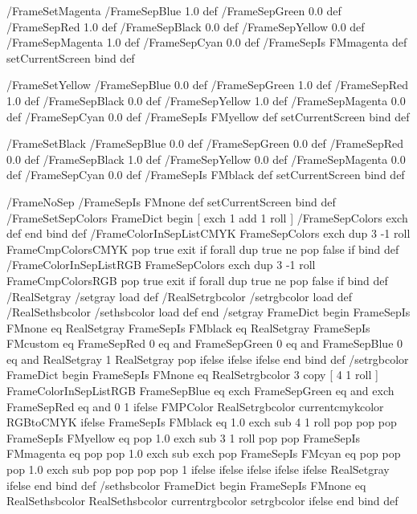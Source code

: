 /FrameSetMagenta {
	/FrameSepBlue 1.0 def
	/FrameSepGreen 0.0 def
	/FrameSepRed 1.0 def
	/FrameSepBlack 0.0 def
	/FrameSepYellow 0.0 def
	/FrameSepMagenta 1.0 def
	/FrameSepCyan 0.0 def
	/FrameSepIs FMmagenta def
	setCurrentScreen
} bind def
 
/FrameSetYellow {
	/FrameSepBlue 0.0 def
	/FrameSepGreen 1.0 def
	/FrameSepRed 1.0 def
	/FrameSepBlack 0.0 def
	/FrameSepYellow 1.0 def
	/FrameSepMagenta 0.0 def
	/FrameSepCyan 0.0 def
	/FrameSepIs FMyellow def
	setCurrentScreen
} bind def
 
/FrameSetBlack {
	/FrameSepBlue 0.0 def
	/FrameSepGreen 0.0 def
	/FrameSepRed 0.0 def
	/FrameSepBlack 1.0 def
	/FrameSepYellow 0.0 def
	/FrameSepMagenta 0.0 def
	/FrameSepCyan 0.0 def
	/FrameSepIs FMblack def
	setCurrentScreen
} bind def
 
/FrameNoSep { 
	/FrameSepIs FMnone def
	setCurrentScreen
} bind def
/FrameSetSepColors { 
	FrameDict begin
	[ exch 1 add 1 roll ]
	/FrameSepColors  
	exch def end
	} bind def
/FrameColorInSepListCMYK { 
	FrameSepColors {  
       		exch dup 3 -1 roll 
       		FrameCmpColorsCMYK 
       		{ pop true exit } if
    	} forall 
	dup true ne {pop false} if
	} bind def
/FrameColorInSepListRGB { 
	FrameSepColors {  
       		exch dup 3 -1 roll 
       		FrameCmpColorsRGB 
       		{ pop true exit } if
    	} forall 
	dup true ne {pop false} if
	} bind def
/RealSetgray /setgray load def
/RealSetrgbcolor /setrgbcolor load def
/RealSethsbcolor /sethsbcolor load def
end 
/setgray { 
	FrameDict begin
	FrameSepIs FMnone eq
		{ RealSetgray } 
		{ 
		FrameSepIs FMblack eq 
			{ RealSetgray } 
			{ FrameSepIs FMcustom eq 
			  FrameSepRed 0 eq and
			  FrameSepGreen 0 eq and
			  FrameSepBlue 0 eq and {
			  	RealSetgray
			  } {
				1 RealSetgray pop 
			  } ifelse
			} ifelse
		} ifelse
	end
} bind def
/setrgbcolor { 
	FrameDict begin
	FrameSepIs FMnone eq
	{  RealSetrgbcolor }
	{
		3 copy [ 4 1 roll ] 
		FrameColorInSepListRGB
		{
				FrameSepBlue eq exch 
			 	FrameSepGreen eq and exch 
			 	FrameSepRed eq and
			 	{ 0 } { 1 } ifelse
		}
		{
			FMPColor {
				RealSetrgbcolor
				currentcmykcolor
			} {
				RGBtoCMYK
			} ifelse
			FrameSepIs FMblack eq
			{1.0 exch sub 4 1 roll pop pop pop} {
			FrameSepIs FMyellow eq
			{pop 1.0 exch sub 3 1 roll pop pop} {
			FrameSepIs FMmagenta eq
			{pop pop 1.0 exch sub exch pop } {
			FrameSepIs FMcyan eq
			{pop pop pop 1.0 exch sub } 
			{pop pop pop pop 1} ifelse } ifelse } ifelse } ifelse 
		} ifelse
		RealSetgray
	} 
	ifelse
	end
} bind def
/sethsbcolor {
	FrameDict begin
	FrameSepIs FMnone eq 
	{ RealSethsbcolor } 
	{
		RealSethsbcolor 
		currentrgbcolor  
		setrgbcolor 
	} 
	ifelse
	end
} bind def
